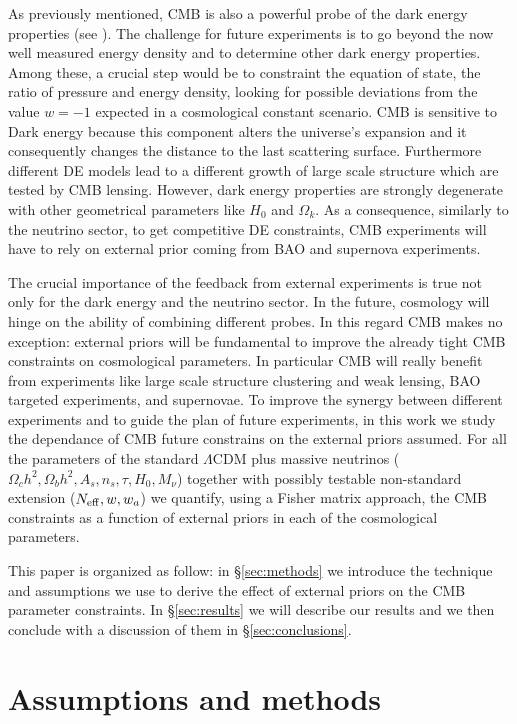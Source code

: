 \documentclass[aps,prd,reprint,superscriptaddress]{revtex4-1}
\newcommand\refsec[1]{\S\ref{sec:#1}}
\begin{document}
As previously mentioned, CMB is also a powerful probe of the dark energy properties (see \cite{2010MNRAS.405.2639J}). The challenge for future experiments is to go beyond the now well measured energy density and to determine other dark energy properties.
Among these, a crucial step would be to constraint the equation of state, the ratio of pressure and energy density, looking for possible deviations from the value $w=-1$ expected in a cosmological constant scenario. 
CMB is sensitive to Dark energy because this component alters the universe's expansion and it consequently changes the distance to the last scattering surface. Furthermore different DE models lead to a different growth of large scale structure which are tested by CMB lensing.
However, dark energy properties are strongly degenerate with other geometrical parameters like $H_{0}$ and $\Omega_{k}$. As a consequence, similarly to the neutrino sector, to get competitive DE constraints, CMB experiments will have to rely on external prior coming from BAO and supernova experiments.

The crucial importance of the feedback from external experiments is true not only for the dark energy and the neutrino sector. 
In the future, cosmology will hinge on the ability of combining different probes. In this regard CMB makes no exception: external priors will be fundamental to improve the already tight CMB constraints on cosmological parameters. 
In particular CMB will really benefit from experiments like large scale structure clustering and weak lensing, BAO targeted experiments, and supernovae. 
To improve the synergy between different experiments and to guide the plan of future experiments, in this work we study the dependance of CMB future constrains on the external priors assumed. For all the parameters of the standard $\Lambda$CDM plus massive neutrinos ($\Omega_c h^2,\Omega_b h^2,A_s,n_s,\tau,H_0,M_{\nu}$) together with possibly testable non-standard extension ($N_{\rm eff},w,w_{a}$) we quantify, using a Fisher matrix approach, the CMB constraints as a function of external priors in each of the cosmological parameters.   

This paper is organized as follow: in \refsec{methods} we introduce the technique and assumptions we use to derive the effect of external priors on the CMB parameter constraints. In \refsec{results} we will describe our results and we then conclude with a discussion of them in \refsec{conclusions}.



\section{Assumptions and methods \label{sec:methods}}
\end{document}

